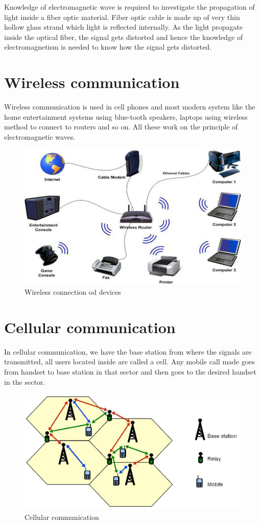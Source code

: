 Knowledge of electromagnetic wave is required to investigate the propagation of light inside a fiber optic material. Fiber optic cable is made up of very thin hollow glass strand which light is reflected internally. As the light propagate inside the optical fiber, the signal gets distorted and hence the knowledge of electromagnetism is needed to know how the signal gets distorted.

\section{Wireless communication}

Wireless communication is used in cell phones and most modern system like the home entertainment systems using blue-tooth speakers, laptops using wireless method to connect to routers and so on. All these work on the principle of electromagnetic waves.
\begin{figure}[h]
\centering
\includegraphics[scale=0.3]{./graphics/Expert-support-for-wireless-communication-projects}
\caption{Wireless connection od devices}
\end{figure}
\section{Cellular communication} 

In cellular communication, we have the base station from where the signals are transmitted, all users located inside are called a cell. Any mobile call made goes from handset to base station in that sector and then goes to the desired handset in the sector.
\begin{figure}[h]
\centering
\includegraphics[scale=0.3]{./graphics/RR_sada_fig1}
\caption{Cellular communication}
\end{figure}

